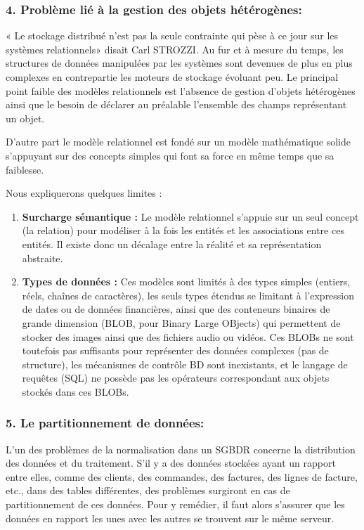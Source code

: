 \subsubsection{4. Problème lié à la gestion des objets hétérogènes: }

« Le stockage distribué n’est pas la seule contrainte qui pèse à ce jour sur les systèmes relationnels» disait Carl STROZZI. Au fur et à mesure du temps, les structures de données manipulées par les systèmes sont devenues de plus en plus complexes en contrepartie les moteurs de stockage évoluant peu. Le principal point faible des modèles relationnels est l’absence de gestion d’objets hétérogènes ainsi que le besoin de déclarer au préalable l’ensemble des champs représentant un objet.

D’autre part le modèle relationnel est fondé sur un modèle mathématique solide s’appuyant sur des concepts simples qui font sa force en même temps que sa faiblesse.

Nous expliquerons quelques limites :

\begin{enumerate}
\item \textbf{Surcharge sémantique :} Le modèle relationnel s’appuie sur un seul concept (la relation) pour modéliser à la fois les entités et les associations entre ces entités. Il existe donc un décalage entre la réalité et sa représentation abstraite.
\item \textbf{Types de données :} Ces modèles sont limités à des types simples (entiers, réels, chaînes de caractères), les seuls types étendus se limitant à l’expression de dates ou de données financières, ainsi que des conteneurs binaires de grande dimension (BLOB, pour Binary Large OBjects) qui permettent de stocker des images ainsi que des fichiers audio ou vidéos. Ces BLOBs ne sont toutefois pas suffisants pour représenter des données complexes (pas de structure), les mécanismes de contrôle BD sont inexistants, et le langage de requêtes (SQL) ne possède pas les opérateurs correspondant aux objets stockés dans ces BLOBs.
\end{enumerate}

\subsubsection{5. Le partitionnement de données:}
L’un des problèmes de la normalisation dans un SGBDR concerne la distribution des données et du traitement. S’il y a des données stockées ayant un rapport entre elles, comme des clients, des commandes, des factures, des lignes de facture, etc., dans des tables différentes, des problèmes surgiront en cas de partitionnement de ces données. Pour y remédier, il faut alors s’assurer que les données en rapport les unes avec les autres se trouvent sur le même serveur.



